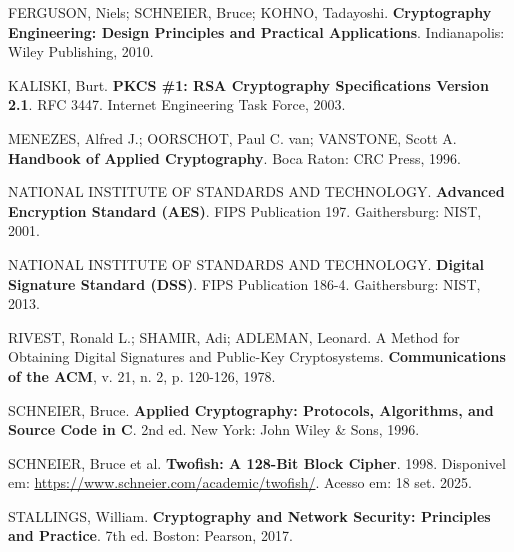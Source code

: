 \documentclass[12pt,a4paper,oneside]{article}
\begin{document}
FERGUSON, Niels; SCHNEIER, Bruce; KOHNO, Tadayoshi. \textbf{Cryptography Engineering: Design Principles and Practical Applications}. Indianapolis: Wiley Publishing, 2010.

KALISKI, Burt. \textbf{PKCS \#1: RSA Cryptography Specifications Version 2.1}. RFC 3447. Internet Engineering Task Force, 2003.

MENEZES, Alfred J.; OORSCHOT, Paul C. van; VANSTONE, Scott A. \textbf{Handbook of Applied Cryptography}. Boca Raton: CRC Press, 1996.

NATIONAL INSTITUTE OF STANDARDS AND TECHNOLOGY. \textbf{Advanced Encryption Standard (AES)}. FIPS Publication 197. Gaithersburg: NIST, 2001.

NATIONAL INSTITUTE OF STANDARDS AND TECHNOLOGY. \textbf{Digital Signature Standard (DSS)}. FIPS Publication 186-4. Gaithersburg: NIST, 2013.

RIVEST, Ronald L.; SHAMIR, Adi; ADLEMAN, Leonard. A Method for Obtaining Digital Signatures and Public-Key Cryptosystems. \textbf{Communications of the ACM}, v. 21, n. 2, p. 120-126, 1978.

SCHNEIER, Bruce. \textbf{Applied Cryptography: Protocols, Algorithms, and Source Code in C}. 2nd ed. New York: John Wiley \& Sons, 1996.

SCHNEIER, Bruce et al. \textbf{Twofish: A 128-Bit Block Cipher}. 1998. Disponivel em: \url{https://www.schneier.com/academic/twofish/}. Acesso em: 18 set. 2025.

STALLINGS, William. \textbf{Cryptography and Network Security: Principles and Practice}. 7th ed. Boston: Pearson, 2017.
\end{document}
